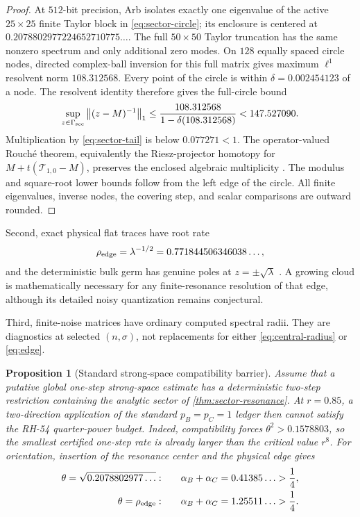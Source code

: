 \documentclass[11pt]{article}
\newtheorem{proposition}[theorem]{Proposition}
\theoremstyle{remark}
\newcommand{\norm}[1]{\left\lVert#1\right\rVert}
\begin{document}
\begin{proof}
At $512$-bit precision, Arb isolates exactly one eigenvalue of the active
$25\times25$ finite Taylor block in \eqref{eq:sector-circle}; its enclosure
is centered at
$0.2078802977224652710775\ldots$.  The full $50\times50$ Taylor truncation
has the same nonzero spectrum and only additional zero modes.  On $128$
equally spaced circle nodes, directed complex-ball inversion for this full
matrix gives maximum $\ell^1$ resolvent norm
$108.312568$.  Every point of the circle is within
$\delta=0.002454123$ of a node.  The resolvent identity therefore gives the
full-circle bound
\[
 \sup_{z\in\Gamma_{\rm sec}}
 \norm{(z-M)^{-1}}_1
 \le\frac{108.312568}{1-\delta(108.312568)}
 <147.527090.
\]
Multiplication by \eqref{eq:sector-tail} is below $0.077271<1$.
The operator-valued Rouch\'e theorem, equivalently the Riesz-projector
homotopy for $M+t(\mathcal T_{1,0}-M)$, preserves the enclosed algebraic
multiplicity \citep{Kato1995}.  The modulus and square-root lower bounds
follow from the left edge of the circle.  All finite eigenvalues, inverse
nodes, the covering step, and scalar comparisons are outward rounded.
\end{proof}

Second, exact physical flat traces have root rate
\begin{equation}
 \rho_{\rm edge}
 =\lambda^{-1/2}
 =0.771844506346038\ldots,
 \label{eq:edge}
\end{equation}
and the deterministic bulk germ has genuine poles at
$z=\pm\sqrt\lambda$ \citep{WangBulkScattering2026}.  A growing cloud is
mathematically necessary for any finite-resonance resolution of that edge,
although its detailed noisy quantization remains conjectural.

Third, finite-noise matrices have ordinary computed spectral radii.  They
are diagnostics at selected $(n,\sigma)$, not replacements for either
\eqref{eq:central-radius} or \eqref{eq:edge}.

\begin{proposition}[Standard strong-space compatibility barrier]
\label{prop:black-box-no-go}
Assume that a putative global one-step strong-space estimate has a
deterministic two-step restriction containing the analytic sector of
\cref{thm:sector-resonance}.  At $r=0.85$, a two-direction application of
the standard $p_B=p_C=1$ ledger then cannot satisfy the RH-54 quarter-power
budget.  Indeed, compatibility forces $\theta^2>0.1578803$, so the smallest
certified one-step rate is already larger than the critical value $r^8$.  For
orientation, insertion of the resonance center and the physical edge gives
\begin{align}
 \theta=\sqrt{0.2078802977\ldots}:
 &\qquad \alpha_B+\alpha_C=0.41385\ldots>\frac14,
 \label{eq:sector-cost}\\
 \theta=\rho_{\rm edge}:
 &\qquad \alpha_B+\alpha_C=1.25511\ldots>\frac14.
 \label{eq:edge-cost}
\end{align}
\end{proposition}
\end{document}
